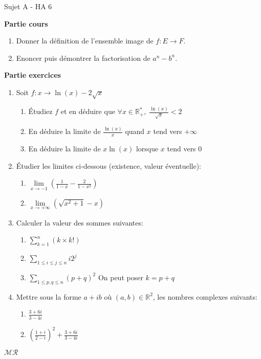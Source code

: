 \documentclass[a4paper,11pt, landscape]{article}
\begin{document}
\begin{multicols*}{4}
\setlength{\columnsep}{1cm}
\centerline{Sujet A - HA 6}
\begin{flushleft}
  \textbf{Partie cours} 
\end{flushleft} 

\begin{enumerate}[leftmargin=*]
  \item Donner la définition de l'ensemble image de $f : E \rightarrow F$.
  \item Enoncer puis démontrer la factorisation de $a^n - b^n$.
\end{enumerate}
\textbf{Partie exercices}
\begin{enumerate}[leftmargin=*]
  \item Soit $f : x \rightarrow \ln \left(x\right) - 2\sqrt{x}$
 \begin{enumerate}
   \item Étudiez $f$ et en déduire que $\forall x \in \mathbb{R}_+^*, \; \frac{\ln (x)}{\sqrt{x}} < 2$
   \item En déduire la limite de $\frac{\ln(x)}{x}$ quand $x$ tend vers $+\infty$
   \item En déduire la limite de $x\ln(x)$ lorsque $x$ tend vers 0
 \end{enumerate}
  \item Étudier les limites ci-dessous (existence, valeur éventuelle):
  \begin{enumerate}
    \item $\lim\limits_{x \rightarrow -1}\left(\frac{1}{1-x} - \frac{2}{1-x^2}\right)$
    \item $\lim\limits_{x \rightarrow +\infty }\left(\sqrt{x^2+1} - x\right)$
  \end{enumerate}
  \item Calculer la valeur des sommes suivantes:
  \begin{enumerate}
    \item $\sum\limits_{k=1}^n(k \times  k!)$
    \item $\sum\limits_{1\leq i \leq j \leq n}i2^j$
    \item $\sum\limits_{1\leq p,q \leq n}(p+q)^2$ On peut poser $k = p+q$
  \end{enumerate}
  \item Mettre sous la forme $a + ib$ où $(a,b) \in \mathbb{R}^2$, les nombres complexes suivants:
  \begin{enumerate}
    \item $\frac{3+6i}{3-4i}$
    \item $\left(\frac{1+i}{2-i}\right)^2 + \frac{3+6i}{3-4i}$
  \end{enumerate}
\end{enumerate}
\centerline{$\mathcal{MR}$}


\end{multicols*}
\end{document}
